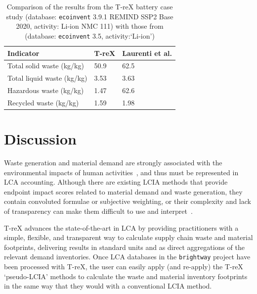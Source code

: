 \documentclass[a4paper,fleqn]{cas-dc}
\renewcommand{\texttt}[1]{{\ttfamily\small\nolinkurl{#1}}}
\begin{document}
\begin{table}
	\centering
	\caption{Comparison of the results from the T-reX battery case study (database: \texttt{ecoinvent} 3.9.1 REMIND SSP2 Base 2020, activity: Li-ion NMC 111) with those from \cite{laurenti2023wastefootprint} (database: \texttt{ecoinvent} 3.5, activity:`Li-ion')}\label{tab:results-case_study-comparison}
	\begin{tabular}{lll}
		\toprule
		\textbf{Indicator}         & \textbf{T-reX} & \textbf{Laurenti et al.} \\
		\midrule
		Total solid waste (kg/kg)  & 50.9           & 62.5                     \\
		Total liquid waste (kg/kg) & 3.53           & 3.63                     \\
		Hazardous waste (kg/kg)    & 1.47           & 62.6                     \\
		Recycled waste (kg/kg)     & 1.59           & 1.98                     \\
		\bottomrule
	\end{tabular}
\end{table}

\section{Discussion}\label{sec:discussion}
Waste generation and material demand are strongly associated with the
environmental impacts of human
activities~\citep{laurenti2023wastefootprint,steinmann2017resourcefootprints,
	demirer2019wastefootprint}, and thus must be represented in LCA accounting.
Although there are existing LCIA methods that provide endpoint impact scores
related to material demand and waste generation, they contain convoluted
formulae or subjective weighting, or their complexity and lack of transparency
can make them difficult to use and
interpret~\citep{foen2021ecofactors,hauschild2003edip,cen2019en15804,
	arvidsson2020csi,foen2021ecofactors}.

T-reX advances the state-of-the-art in LCA by providing practitioners with a
simple, flexible, and transparent way to calculate supply chain waste and
material footprints, delivering results in standard units and as direct
aggregations of the relevant demand inventories. Once LCA databases in the
\texttt{brightway} project have been processed with T-reX, the user can easily
apply (and re-apply) the T-reX `pseudo-LCIA' methods to calculate the waste and
material inventory footprints in the same way that they would with a
conventional LCIA method.
\end{document}
